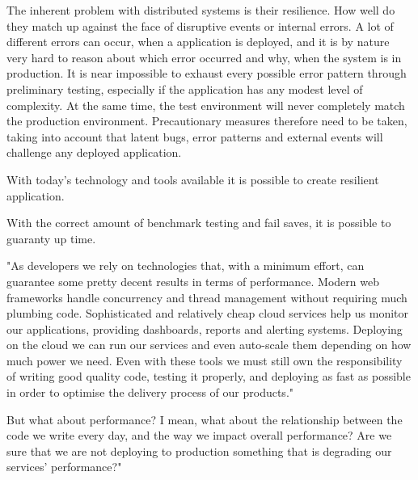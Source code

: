 The inherent problem with distributed systems is their resilience. How well do they match up against the face of disruptive events or internal errors. A lot of different errors can occur, when a application is deployed, and it is by nature very hard to reason about which error occurred and why, when the system is in production. It is near impossible to exhaust every possible error pattern through preliminary testing, especially if the application has any modest level of complexity. At the same time, the test environment will never completely match the production environment. Precautionary measures therefore need to be taken, taking into account that latent bugs, error patterns and external events will challenge any deployed application. 

With today's technology and tools available it is possible to create resilient application.

With the correct amount of benchmark testing and fail saves, it is possible to guaranty up time.

"As developers we rely on technologies that, with a minimum effort, can guarantee some pretty decent results in terms of performance. Modern web frameworks handle concurrency and thread management without requiring much plumbing code. Sophisticated and relatively cheap cloud services help us monitor our applications, providing dashboards, reports and alerting systems. Deploying on the cloud we can run our services and even auto-scale them depending on how much power we need. Even with these tools we must still own the responsibility of writing good quality code, testing it properly, and deploying as fast as possible in order to optimise the delivery process of our products."

But what about performance? I mean, what about the relationship between the code we write every day, and the way we impact overall performance? Are we sure that we are not deploying to production something that is degrading our services’ performance?"



